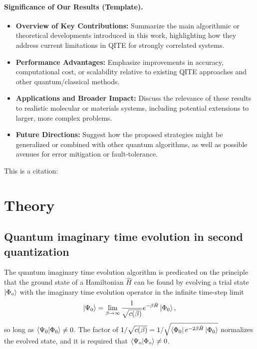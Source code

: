 \documentclass[aip,jcp,amsmath,amssymb, reprint]{revtex4-1}
\begin{document}
\paragraph{Significance of Our Results (Template).}
\begin{itemize}
    \item \textbf{Overview of Key Contributions:} Summarize the main algorithmic or theoretical developments introduced in this work, highlighting how they address current limitations in QITE for strongly correlated systems.
    \item \textbf{Performance Advantages:} Emphasize improvements in accuracy, computational cost, or scalability relative to existing QITE approaches and other quantum/classical methods.
    \item \textbf{Applications and Broader Impact:} Discuss the relevance of these results to realistic molecular or materials systems, including potential extensions to larger, more complex problems.
    \item \textbf{Future Directions:} Suggest how the proposed strategies might be generalized or combined with other quantum algorithms, as well as possible avenues for error mitigation or fault-tolerance.
\end{itemize}








This is a citation: \cite{Schriber2016Adaptive}

\section{\label{sec:theory}Theory}


\subsection{Quantum imaginary time evolution in second quantization}
The quantum imaginary time evolution algorithm is predicated on the principle that the ground state of a Hamiltonian $\hat{H}$ can be found by evolving a trial state $\ket{\Phi_o}$ with the imaginary time evolution operator in the infinite time-step limit
\begin{equation}
\ket{\Psi_0} = \lim_{\beta \rightarrow \infty} \frac{1}{\sqrt{ c(\beta) }} e^{-\beta \hat{H} } \ket{\Phi_0},
\end{equation}
so long as  $\braket{\Psi_0 | \Phi_0} \neq 0$.
The factor of $1 / \sqrt{ c(\beta) } = 1/ \sqrt{ \bra{\Phi_0} e^{-2 \beta \hat{H}} \ket{\Phi_0}}$ normalizes the evolved state, and it is required that $\braket{\Psi_o | \Phi_o} \neq 0$.  
\end{document}
